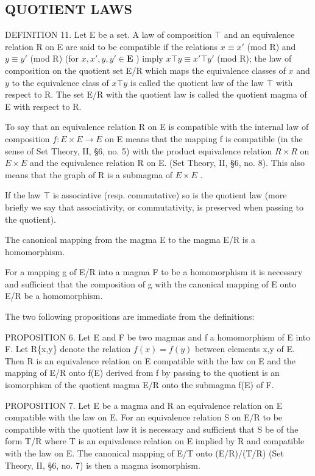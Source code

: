 \subsection{QUOTIENT LAWS}

DEFINITION 11. Let E be a set. A law of composition \(\top\) and an equivalence relation R on E are said to be compatible if the relations \(x \equiv x'\) (mod R) and \(y \equiv y'\) (mod R) (for \(x, x', y, y' \in \mathbf{E}\) ) imply \(x \top y \equiv x' \top y'\) (mod R); the law of composition on the quotient set E/R which maps the equivalence classes of \(x\) and \(y\) to the equivalence class of \(x \top y\) is called the quotient law of the law \(\top\) with respect to R. The set E/R with the quotient law is called the quotient magma of E with respect to R.

To say that an equivalence relation R on E is compatible with the internal law of composition \(f: E \times E \to E\) on E means that the mapping f is compatible (in the sense of Set Theory, II, §6, no. 5) with the product equivalence relation \(R \times R\) on \(E \times E\) and the equivalence relation R on E. (Set Theory, II, §6, no. 8). This also means that the graph of R is a submagma of \(E \times E\) .

If the law \(\top\) is associative (resp. commutative) so is the quotient law (more briefly we say that associativity, or commutativity, is preserved when passing to the quotient).

The canonical mapping from the magma E to the magma E/R is a homomorphism.

For a mapping g of E/R into a magma F to be a homomorphism it is necessary and sufficient that the composition of g with the canonical mapping of E onto E/R be a homomorphism.

The two following propositions are immediate from the definitions:

PROPOSITION 6. Let E and F be two magmas and f a homomorphism of E into F. Let R\{x,y\} denote the relation \(f(x)=f(y)\) between elements x,y of E. Then R is an equivalence relation on E compatible with the law on E and the mapping of E/R onto f(E) derived from f by passing to the quotient is an isomorphism of the quotient magma E/R onto the submagma f(E) of F.

PROPOSITION 7. Let E be a magma and R an equivalence relation on E compatible with the law on E. For an equivalence relation S on E/R to be compatible with the quotient law it is necessary and sufficient that S be of the form T/R where T is an equivalence relation on E implied by R and compatible with the law on E. The canonical mapping of E/T onto (E/R)/(T/R) (Set Theory, II, §6, no. 7) is then a magma isomorphism.

